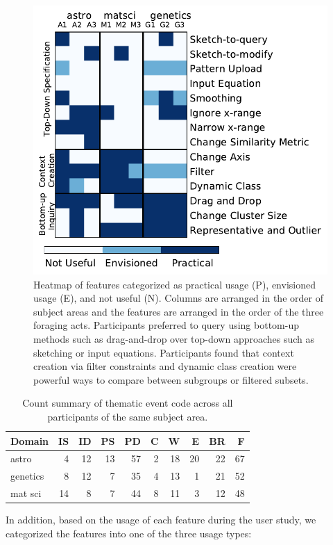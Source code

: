  \begin{figure}[ht!]
     \centering
     \includegraphics[width=0.7\columnwidth]{figures/PENcoding.pdf}
     \vspace{-6pt}\caption{Heatmap of features categorized as practical usage (P), envisioned usage (E), and not useful (N). Columns are arranged in the order of subject areas and the features are arranged in the order of the three foraging acts. Participants preferred to query using bottom-up methods such as drag-and-drop over top-down approaches such as sketching or input equations. Participants found that context creation via filter constraints and dynamic class creation were powerful ways to compare between subgroups or filtered subsets.}
     \label{feature_heatmap}
     \vspace{-5pt}
 \end{figure}
 \begin{table}[h!]
   \begin{tabular}{lrrrrrrrrr}
   \hline
    Domain           &   IS &   ID &   PS &   PD &   C &   W &   E &   BR &   F \\
   \hline
    astro            &    4 &   12 &   13 &   57 &   2 &  18 &  20 &   22 &  67 \\
    genetics         &    8 &   12 &    7 &   35 &   4 &  13 &   1 &   21 &  52 \\
    mat sci          &   14 &    8 &    7 &   44 &   8 &  11 &   3 &   12 &  48 \\
   \hline
   \end{tabular}
   \caption{Count summary of thematic event code across all participants of the same subject area.}
 \end{table}
 \npar In addition, based on the usage of each feature during the user study, we categorized the features into one of the three usage types:
